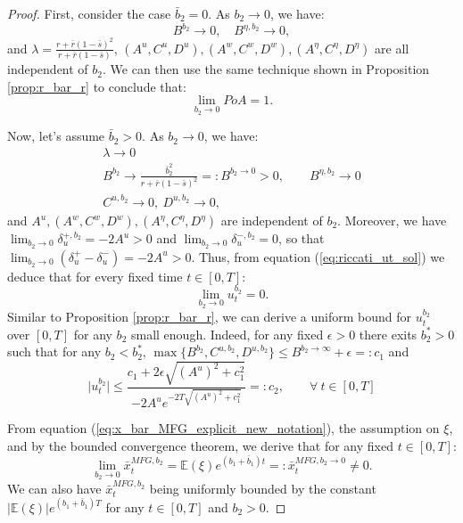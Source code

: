 \documentclass[11pt]{article}
\begin{document}
\begin{proof}
	First, consider the case $\bar{b}_2 =0$. As $b_2 \to 0$, we have:
	\begin{equation*}
		B^{b_2} \to 0, \quad B^{\eta,b_2} \to 0,
	\end{equation*}
	and $\lambda = \frac{r + \bar{r}(1- \bar{s})^2}{r + \bar{r}(1-\bar{s})}$, $(A^{u},C^{u}, D^{u}), (A^{w}, C^{w}, D^{w}), (A^\eta, C^\eta, D^\eta)$ are all independent of $b_2$. We can then use the same technique shown in Proposition \ref{prop:r_bar_r} to conclude that:
	$$\lim_{b_2 \to 0} PoA = 1.$$ 
	
	Now, let's assume $\bar{b}_2 > 0$.	As $b_2 \to 0$, we have:
	\begin{equation*}
	\begin{array}{l}
		\lambda \longrightarrow 0\\
		\displaystyle B^{b_2} \longrightarrow{}  \frac{\bar{b}_2^2}{r + \bar{r}(1-\bar{s})^2}=:B^{b_2 \to 0} >0, \qquad B^{\eta,b_2} \longrightarrow{} 0 \\
		C^{u,b_2} \longrightarrow{} 0, \  D^{u,b_2} \longrightarrow{} 0,
	\end{array}
	\end{equation*}
	and $A^u, (A^w, C^w, D^w), (A^\eta, C^\eta, D^\eta)$ are independent of $b_2$.
	Moreover, we have $\lim_{b_2 \to 0}\delta^{+,b_2}_u =-2A^u >0 $ and $\lim_{b_2 \to 0}\delta^{-,b_2}_u = 0$, so that $\lim_{b_2 \to 0}(\delta^{+}_u - \delta^{-}_u) = -2 A^u > 0$. Thus, from equation (\ref{eq:riccati_ut_sol}) we deduce that for every fixed time $t \in [0,T]$:
	$$\lim_{b_2 \to 0}u^{b_2}_t = 0 .$$
	Similar to Proposition \ref{prop:r_bar_r}, we can derive a uniform bound for $u_t^{b_2}$ over $[0,T]$ for any $b_2$ small enough. Indeed, for any fixed $\epsilon >0$ there exits $b_2^* >0$ such that for any $b_2 < b_2^*$, $\max \{B^{b_2}, C^{u,b_2}, D^{u,b_2} \} \leq B^{b_2 \to \infty} + \epsilon =: c_1$ and
	\begin{equation*}
	 \vert u_t^{b_2} \vert \leq \frac{c_1 + 2 \epsilon \sqrt{(A^u)^2 + c_1^2} }{- 2 A^u e^{-2T \sqrt{(A^u)^2 + c_1^2} } } =: c_2 ,\qquad \forall  \  t \in [0,T]
	\end{equation*}
	
	From equation (\ref{eq:x_bar_MFG_explicit_new_notation}), the assumption on $\xi$, and by the bounded convergence theorem, we derive that for any fixed $t \in [0,T]$:
	$$\lim_{b_2 \to 0} \bar{x}_t^{MFG,b_2} = \mathbb{E}(\xi) e^{(b_1+\bar{b}_1)t} =: \bar{x}_t^{MFG,b_2 \to 0} \neq 0.$$
	We can also have $\bar{x}_t^{MFG,b_2}$ being uniformly bounded by the constant $\vert \mathbb{E}(\xi) \vert e^{(b_1 + \bar{b}_1) T}$ for any $t \in [0,T]$ and $b_2 > 0$.
	

\end{proof}
\end{document}
